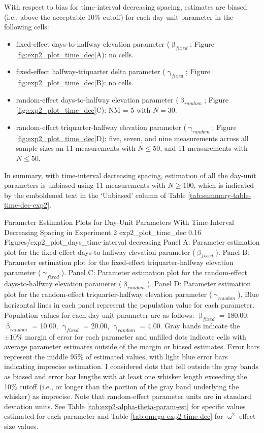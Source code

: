 \documentclass[
12pt, %
twoside,
english]{guelphthesis}
\theoremstyle{definition}
\theoremstyle{definition}
\theoremstyle{definition}
\theoremstyle{definition}
\theoremstyle{remark}
\begin{document}
With respect to bias for time-interval decreasing spacing, estimates are biased (i.e., above the acceptable 10\% cutoff) for each day-unit parameter in the following cells:
\begin{itemize}
\tightlist
\item
  fixed-effect days-to-halfway elevation parameter (\(\upbeta_{fixed}\); Figure \ref{fig:exp2_plot_time_dec}A): no cells.
\item
  fixed-effect halfway-triquarter delta parameter (\(\upgamma_{fixed}\); Figure \ref{fig:exp2_plot_time_dec}B): no cells.
\item
  random-effect days-to-halfway elevation parameter (\(\upbeta_{random}\); Figure \ref{fig:exp2_plot_time_dec}C): NM = 5 with \(N = 30\).\\
\item
  random-effect triquarter-halfway elevation parameter (\(\upgamma_{random}\); Figure \ref{fig:exp2_plot_time_dec}D): five, seven, and nine measurements across all sample sizes an 11 measurements with \(N \le 50\), and 11 measurements with \(N \le 50\).
\end{itemize}
In summary, with time-interval decreasing spacing, estimation of all the day-unit parameters is unbiased using 11 measurements with \(N \ge 100\), which is indicated by the emboldened text in the `Unbiased' column of Table \ref{tab:summary-table-time-dec-exp2}.
\begin{apaFigure}
[portrait]
[samepage]
[-0.2cm]
{Parameter Estimation Plots for Day-Unit Parameters With Time-Interval Decreasing Spacing in Experiment 2}
{exp2_plot_time_dec}
{0.16}
{Figures/exp2_plot_days_time-interval decreasing}
{Panel A: Parameter estimation plot for the fixed-effect days-to-halfway elevation parameter ($\upbeta_{fixed}$). Panel B: Parameter estimation plot for the fixed-effect triquarter-halfway elevation parameter ($\upgamma_{fixed}$). Panel C: Parameter estimation plot for the random-effect days-to-halfway elevation parameter ($\upbeta_{random}$). Panel D: Parameter estimation plot for the random-effect triquarter-halfway elevation parameter ($\upgamma_{random}$). Blue horizontal lines in each panel represent the population value for each parameter. Population values for each day-unit parameter are as follows: $\upbeta_{fixed}$ = 180.00, $\upbeta_{random}$ = 10.00, $\upgamma_{fixed}$ = 20.00, $\upgamma_{random}$ = 4.00. Gray bands indicate the $\pm 10\%$ margin of error for each parameter and unfilled dots indicate cells with average parameter estimates outside of the margin or biased estimates. Error bars represent the middle 95\% of estimated values, with light blue error bars indicating imprecise estimation. I considered dots that fell outside the gray bands as biased and error bar lengths with at least one whisker length exceeding the 10\% cutoff (i.e., or longer than the portion of the gray band underlying the whisker) as imprecise. Note that random-effect parameter units are in standard deviation units. See Table \ref{tab:exp2-alpha-theta-param-est} for specific values estimated for each parameter and Table \ref{tab:omega-exp2-time-dec} for $\upomega^2$ effect size values.}
\end{apaFigure}
\end{document}
